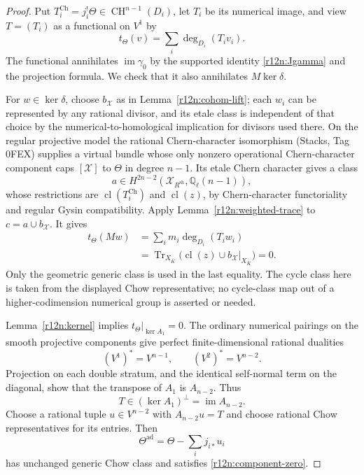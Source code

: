 \begin{proof}
Put $T_i^{\mathrm{Ch}}=j_i^!\Theta\in\operatorname{CH}^{n-1}(D_i)$,
let $T_i$ be its numerical image, and view $T=(T_i)$ as a functional
on $V^1$ by
\[
                   t_\Theta(v)=\sum_i\deg_{D_i}(T_iv_i).
\]
The functional annihilates $\operatorname{im}\gamma_0$ by the
supported identity \eqref{r12n:Jgamma} and the projection formula.
We check that it also annihilates $M\ker\delta$.

For $w\in\ker\delta$, choose $b_{\mathcal X}$ as in
Lemma~\ref{r12n:cohom-lift}; each $w_i$ can be represented by any
rational divisor, and its etale class is independent of that choice
by the numerical-to-homological implication for divisors used there.
On the regular projective model the
rational Chern-character isomorphism (Stacks, Tag 0FEX) supplies
a virtual bundle whose only nonzero operational Chern-character
component caps $[\mathcal X]$ to $\Theta$ in degree $n-1$.
Its etale Chern character gives a class
\[
 a\in H^{2n-2}(\mathcal X_{R^{\mathrm{sh}}},\mathbb Q_\ell(n-1)),
\]
whose restrictions are $\operatorname{cl}(T_i^{\mathrm{Ch}})$ and
$\operatorname{cl}(z)$, by Chern-character functoriality and regular
Gysin compatibility.  Apply Lemma~\ref{r12n:weighted-trace} to
$c=a\cup b_{\mathcal X}$.  It gives
\[
 \begin{split}
 t_\Theta(Mw)
    &=\sum_i m_i\deg_{D_i}(T_iw_i)\\
    &=\operatorname{Tr}_{X_{\bar K}}
        \bigl(\operatorname{cl}(z)\cup b_{\mathcal X}|_{X_{\bar K}}\bigr)
      =0.
 \end{split}
\tag{NL18}\label{r12n:obstruction-zero}
\]
Only the geometric generic class is used in the last equality.
The cycle class here is taken from the displayed Chow representative;
no cycle-class map out of a higher-codimension numerical group is
asserted or needed.

Lemma~\ref{r12n:kernel} implies $t_\Theta|_{\ker A_1}=0$.
The ordinary numerical pairings on the smooth projective components
give perfect finite-dimensional rational dualities
\[
 (V^1)^*=V^{n-1},\qquad (V^2)^*=V^{n-2}.
\]
Projection on each double stratum, and the identical self-normal
term on the diagonal, show that the transpose of $A_1$ is
$A_{n-2}$.  Thus
\[
                T\in(\ker A_1)^\perp=\operatorname{im}A_{n-2}.
\]
Choose a rational tuple $u\in V^{n-2}$ with $A_{n-2}u=T$ and
choose rational Chow representatives for its entries.  Then
\[
                 \Theta^{\mathrm{ad}}
                    =\Theta-\sum_i j_{i*}u_i
\tag{NL19}\label{r12n:correction}
\]
has unchanged generic Chow class and satisfies
\eqref{r12n:component-zero}.
\end{proof}

